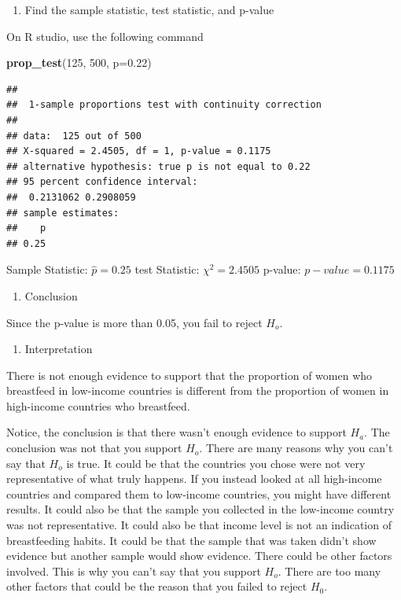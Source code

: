 \documentclass[
]{book}
\newenvironment{Shaded}{\begin{snugshade}}{\end{snugshade}}
\newcommand{\DataTypeTok}[1]{\textcolor[rgb]{0.13,0.29,0.53}{#1}}
\newcommand{\DecValTok}[1]{\textcolor[rgb]{0.00,0.00,0.81}{#1}}
\newcommand{\FloatTok}[1]{\textcolor[rgb]{0.00,0.00,0.81}{#1}}
\newcommand{\KeywordTok}[1]{\textcolor[rgb]{0.13,0.29,0.53}{\textbf{#1}}}
\newcommand{\NormalTok}[1]{#1}
\providecommand{\tightlist}{%
  \setlength{\itemsep}{0pt}\setlength{\parskip}{0pt}}
\begin{document}
\begin{enumerate}
\def\labelenumi{\arabic{enumi}.}
\setcounter{enumi}{3}
\tightlist
\item
  Find the sample statistic, test statistic, and p-value
\end{enumerate}

On R studio, use the following command

\begin{Shaded}
\begin{Highlighting}[]
\KeywordTok{prop_test}\NormalTok{(}\DecValTok{125}\NormalTok{, }\DecValTok{500}\NormalTok{, }\DataTypeTok{p=}\FloatTok{0.22}\NormalTok{)}
\end{Highlighting}
\end{Shaded}

\begin{verbatim}
## 
##  1-sample proportions test with continuity correction
## 
## data:  125 out of 500
## X-squared = 2.4505, df = 1, p-value = 0.1175
## alternative hypothesis: true p is not equal to 0.22
## 95 percent confidence interval:
##  0.2131062 0.2908059
## sample estimates:
##    p 
## 0.25
\end{verbatim}

Sample Statistic: \(\hat{p}=0.25\)
test Statistic: \(\chi^2=2.4505\)
p-value: \(p-value=0.1175\)

\begin{enumerate}
\def\labelenumi{\arabic{enumi}.}
\setcounter{enumi}{4}
\tightlist
\item
  Conclusion
\end{enumerate}

Since the p-value is more than 0.05, you fail to reject \(H_o\).

\begin{enumerate}
\def\labelenumi{\arabic{enumi}.}
\setcounter{enumi}{5}
\tightlist
\item
  Interpretation
\end{enumerate}

There is not enough evidence to support that the proportion of women who breastfeed in low-income countries is different from the proportion of women in high-income countries who breastfeed.

Notice, the conclusion is that there wasn't enough evidence to support \(H_a\). The conclusion was not that you support \(H_o\). There are many reasons why you can't say that \(H_o\) is true. It could be that the countries you chose were not very representative of what truly happens. If you instead looked at all high-income countries and compared them to low-income countries, you might have different results. It could also be that the sample you collected in the low-income country was not representative. It could also be that income level is not an indication of breastfeeding habits. It could be that the sample that was taken didn't show evidence but another sample would show evidence. There could be other factors involved. This is why you can't say that you support \(H_o\). There are too many other factors that could be the reason that you failed to reject \(H_0\).
\end{document}
